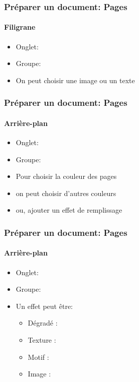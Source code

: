 \documentclass[xcolor=table]{beamer}
\begin{document}
\begin{frame}[t]
\frametitle{Préparer un document: Pages}
\framesubtitle{Filigrane}

\begin{minipage}{0.49\textwidth}
	\begin{itemize}
		\item Onglet: 
		\item Groupe: 
		\item On peut choisir une image ou un texte 
	\end{itemize}
\end{minipage}
\begin{minipage}{0.50\textwidth}
\end{minipage}

\end{frame}

\begin{frame}[t]
\frametitle{Préparer un document: Pages}
\framesubtitle{Arrière-plan}

\begin{minipage}{0.44\textwidth}
	\begin{itemize}
		\item Onglet: 
		\item Groupe: 
		\item Pour choisir la couleur des pages
		\item on peut choisir d'autres couleurs 
		\item ou, ajouter un effet de remplissage
	\end{itemize}
\end{minipage}
\begin{minipage}{0.55\textwidth}
\end{minipage}

\end{frame}

\begin{frame}[t]
\frametitle{Préparer un document: Pages}
\framesubtitle{Arrière-plan}

\begin{minipage}{0.44\textwidth}
	\begin{itemize}
		\item Onglet: 
		\item Groupe: 
		\item Un effet peut être: 
		\begin{itemize}
			\item Dégradé : 
			\item Texture : 
			\item Motif : 
			\item Image : 
		\end{itemize}
	\end{itemize}
\end{minipage}
\begin{minipage}{0.55\textwidth}
\end{minipage}

\end{frame}
\end{document}
